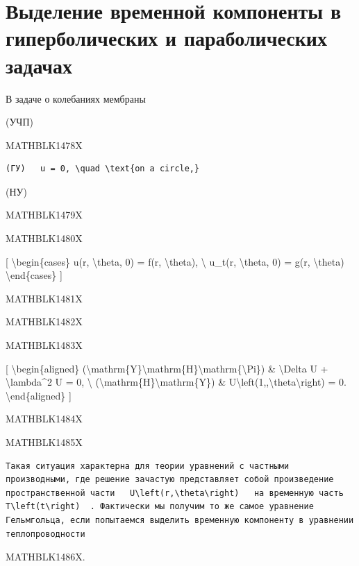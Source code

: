 \documentclass[
]{article}
\begin{document}
\section{Выделение временной компоненты в гиперболических и
параболических
задачах}\label{ux432ux44bux434ux435ux43bux435ux43dux438ux435-ux432ux440ux435ux43cux435ux43dux43dux43eux439-ux43aux43eux43cux43fux43eux43dux435ux43dux442ux44b-ux432-ux433ux438ux43fux435ux440ux431ux43eux43bux438ux447ux435ux441ux43aux438ux445-ux438-ux43fux430ux440ux430ux431ux43eux43bux438ux447ux435ux441ux43aux438ux445-ux437ux430ux434ux430ux447ux430ux445}

В задаче о колебаниях мембраны

(УЧП)

MATHBLK1478X

\begin{verbatim}
(ГУ)   u = 0, \quad \text{on a circle,}
\end{verbatim}

(НУ)

MATHBLK1479X

MATHBLK1480X

{[} \textbackslash begin\{cases\} u(r, \textbackslash theta, 0) = f(r,
\textbackslash theta), \textbackslash{} u\_t(r, \textbackslash theta, 0)
= g(r, \textbackslash theta) \textbackslash end\{cases\} {]}

MATHBLK1481X

MATHBLK1482X

MATHBLK1483X

{[} \textbackslash begin\{aligned\}
(\textbackslash mathrm\{Y\}\textbackslash mathrm\{H\}\textbackslash mathrm\{\textbackslash Pi\})
\& \textbackslash Delta U + \textbackslash lambda\^{}2 U = 0,
\textbackslash{} (\textbackslash mathrm\{H\}\textbackslash mathrm\{Y\})
\& U\textbackslash left(1,,\textbackslash theta\textbackslash right) =
0. \textbackslash end\{aligned\} {]}

MATHBLK1484X

MATHBLK1485X

\begin{verbatim}
Такая ситуация характерна для теории уравнений с частными производными, где решение зачастую представляет собой произведение пространственной части   U\left(r,\theta\right)   на временную часть   T\left(t\right)  . Фактически мы получим то же самое уравнение Гельмгольца, если попытаемся выделить временную компоненту в уравнении теплопроводности
\end{verbatim}

MATHBLK1486X.
\end{document}
